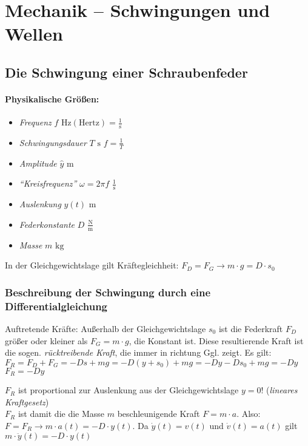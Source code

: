\documentclass[a4paper]{scrartcl}
\begin{document}
\section{Mechanik -- Schwingungen und Wellen}
\subsection{Die Schwingung einer Schraubenfeder}
\paragraph{Physikalische Größen:} \begin{itemize}
	\item \emph{Frequenz} $f$ $\mathrm{Hz (Hertz)} = \frac{1}{\mathrm{s}}$
	\item \emph{Schwingungsdauer} $T$ $\mathrm{s}$ $f = \frac{1}{T}$
	\item \emph{Amplitude} $\hat{y}$ $\mathrm{m}$
	\item \emph{"`Kreisfrequenz"'} $\omega = 2 \pi f$ $\frac{1}{\mathrm{s}}$
	\item \emph{Auslenkung} $y(t)$ $\mathrm{m}$
	\item \emph{Federkonstante} $D$ $\frac{\mathrm{N}}{\mathrm{m}}$
	\item \emph{Masse} $m$ $\mathrm{kg}$
\end{itemize}
In der Gleichgewichtslage gilt Kräftegleichheit: $F_D = F_G \rightarrow m \cdot
g = D \cdot s_0$

\subsubsection{Beschreibung der Schwingung durch eine Differentialgleichung}
Auftretende Kräfte: Außerhalb der Gleichgewichtslage $s_0$ ist die Federkraft
$F_D$ größer oder kleiner als $F_G = m \cdot g$, die Konstant ist. Diese
resultierende Kraft ist die sogen. \emph{rücktreibende Kraft}, die immer in
richtung Ggl. zeigt. Es gilt: $F_R = F_D + F_G = -Ds + mg = -D(y+s_0) + mg =
-Dy-Ds_0 + mg = -Dy$ $F_R = -Dy$ %

$F_R$ ist proportional zur Auslenkung aus der Gleichgewichtslage $y=0$!
(\emph{lineares Kraftgesetz})\\
$F_R$ ist damit die die Masse $m$ beschleunigende Kraft $F=m \cdot a$. Also: $F
= F_R \rightarrow m \cdot a(t) = -D \cdot y(t)$. Da $\dot{y}(t) = v(t)$ und
$\dot{v}(t) = a(t)$ gilt $m \cdot \ddot{y}(t) = -D \cdot y(t)$
\end{document}
